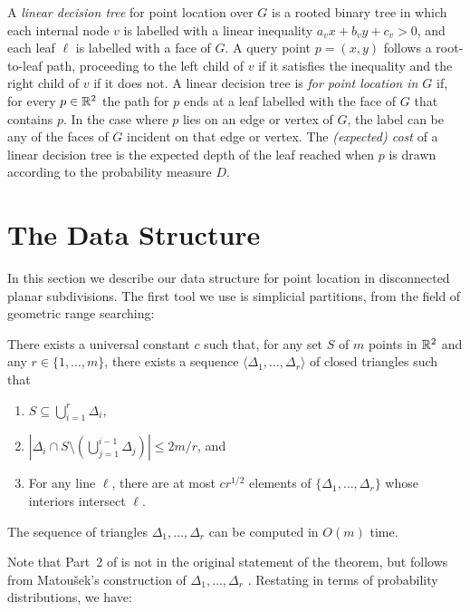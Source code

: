 \documentclass{patmorin}
\begin{document}
A \emph{linear decision tree} for point location over $G$ is a rooted
binary tree in which each internal node $v$ is labelled with a linear
inequality $a_vx + b_vy + c_v > 0$, and each leaf $\ell$ is labelled
with a face of $G$.  A query point $p=(x,y)$ follows a root-to-leaf path,
proceeding to the left child of $v$ if it satisfies the inequality and the
right child of $v$ if it does not.  A linear decision tree is \emph{for
point location in $G$} if, for every $p\in\mathbb{R}^2$ the path for $p$ ends at a
leaf labelled with the face of $G$ that contains $p$. In the case where
$p$ lies on an edge or vertex of $G$, the label can be any of the faces
of $G$ incident on that edge or vertex.  The \emph{(expected) cost} of a
linear decision tree is the expected depth of the leaf reached when $p$
is drawn according to the probability measure $D$.


\section{The Data Structure}

In this section we describe our data structure for point location in
disconnected planar subdivisions.  The first tool we use is simplicial
partitions, from the field of geometric range searching:

\begin{thm}[Matou\v{s}ek 1992]
There exists a universal constant $c$ such that, for any set $S$ of $m$
points in $\mathbb{R}^2$ and any $r\in\{1,\ldots,m\}$, there exists a sequence
$\langle \Delta_1,\ldots,\Delta_r\rangle$ of closed triangles such that
  \begin{enumerate}
    \item $S\subseteq \bigcup_{i=1}^r \Delta_i$,
  
    \item $\left|\Delta_i \cap S\setminus
    \left(\bigcup_{j=1}^{i-1}\Delta_j\right)\right| \le 2m/r$, and
  
    \item For any line $\ell$, there are at most $cr^{1/2}$ elements of
  $\{\Delta_1,\ldots,\Delta_r\}$ whose interiors intersect $\ell$.
  \end{enumerate}
  The sequence of triangles $\Delta_1,\ldots,\Delta_r$ can be computed
  in $O(m)$ time.
\end{thm}

Note that Part~2 of  is not in the original
statement of the theorem, but follows from Matou\v{s}ek's construction
of $\Delta_1,\ldots,\Delta_r$ \cite{m92}.
Restating  in terms of probability distributions,
we have:
\end{document}
